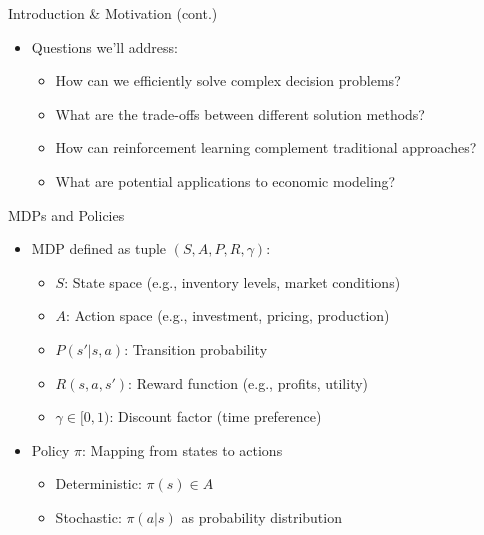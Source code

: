 \documentclass[10pt]{beamer}
\begin{document}
\begin{frame}{Introduction \& Motivation (cont.)}
    \begin{itemize}
        \item Questions we'll address:
        \begin{itemize}
            \item How can we efficiently solve complex decision problems?
            \item What are the trade-offs between different solution methods?
            \item How can reinforcement learning complement traditional approaches?
            \item What are potential applications to economic modeling?
        \end{itemize}
    \end{itemize}
\end{frame}


\begin{frame}{MDPs and Policies}
    \begin{itemize}
        \item MDP defined as tuple $(S, A, P, R, \gamma)$:
        \begin{itemize}
            \item $S$: State space (e.g., inventory levels, market conditions)
            \item $A$: Action space (e.g., investment, pricing, production)
            \item $P(s'|s,a)$: Transition probability
            \item $R(s,a,s')$: Reward function (e.g., profits, utility)
            \item $\gamma \in [0,1)$: Discount factor (time preference)
        \end{itemize}
        \vspace{0.2cm}
        \item Policy $\pi$: Mapping from states to actions
        \begin{itemize}
            \item Deterministic: $\pi(s) \in A$
            \item Stochastic: $\pi(a|s)$ as probability distribution
        \end{itemize}
    \end{itemize}
\end{frame}
\end{document}
